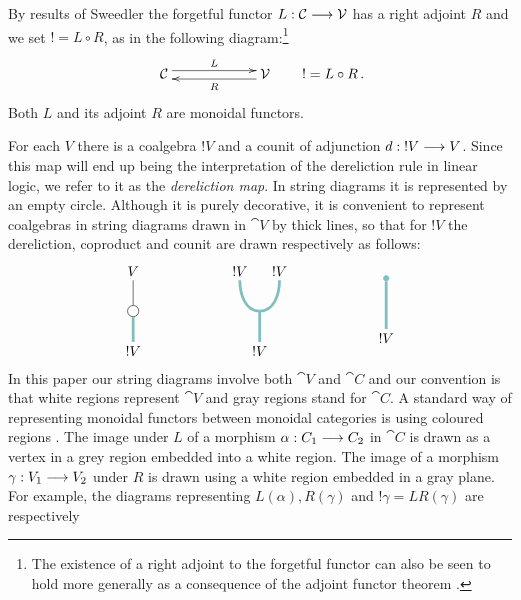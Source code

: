 \documentclass[english,letter paper,12pt,reqno]{article}
\def\drawbang{\draw[color=teal!50, line width=2pt]}
\def\dernode{\node[circle,draw=black,fill=white]}
\theoremstyle{example}
\begin{document}
By results of Sweedler \cite[Chapter 6]{sweedler} the forgetful functor $L: \mathcal{C} \longrightarrow \mathcal{V}$ has a right adjoint $R$ and we set ${!} = L \circ R$, as in the following diagram:\footnote{The existence of a right adjoint to the forgetful functor can also be seen to hold more generally as a consequence of the adjoint functor theorem \cite{barr}.}
\[
\xymatrix@C+3pc{
\cat{C}\ar@<0.7ex>[r]^-{L} & \cat{V} \ar@<0.7ex>[l]^-{R}
}
\qquad
! = L \circ R\,.
\]
Both $L$ and its adjoint $R$ are monoidal functors.

For each $V$ there is a coalgebra $! V$ and a counit of adjunction $d: {!} V \longrightarrow V$. Since this map will end up being the interpretation of the dereliction rule in linear logic, we refer to it as the \emph{dereliction map}. In string diagrams it is represented by an empty circle. Although it is purely decorative, it is convenient to represent coalgebras in string diagrams drawn in $\cat{V}$ by thick lines, so that for ${!} V$ the dereliction, coproduct and counit are drawn respectively as follows:
\begin{equation}\label{eq:coalgebra_maps}
\begin{tikzpicture}[scale=0.5,auto,inner sep=1mm,baseline=(current  bounding  box.center)]
\node (top) at (0,2) {$V$};
\dernode (d) at (0,0) {};
\node (banga) at (0,-2) {$!V$};
\drawbang (banga) -- (d);
\draw (d) -- (top);
\end{tikzpicture}
\qquad\qquad\qquad
\begin{tikzpicture}[scale=0.5,auto,inner sep=1mm,baseline=(current  bounding  box.center)]
\node (topl) at (-1,2) {${!} V$};
\node (topr) at (1,2) {${!} V$};
\coordinate (d) at (0,0);
\node (banga) at (0,-2) {$!V$};
\drawbang (banga) -- (d);
\drawbang[out=0,in=270] (d) to (topr);
\drawbang[out=180,in=270] (d) to (topl);
\end{tikzpicture}
\qquad\qquad\qquad
\begin{tikzpicture}[scale=0.5,auto,inner sep=1mm,baseline=(current  bounding  box.center)]
\node (banga) at (0,-2) {$!V$};
\node[circle,draw=teal!50,fill=teal!50,inner sep=0.5mm] (blah) at (0,1) {};
\drawbang (banga) -- (blah);
\end{tikzpicture}
\end{equation}
In this paper our string diagrams involve both $\cat{V}$ and $\cat{C}$ and our convention is that white regions represent $\cat{V}$ and gray regions stand for $\cat{C}$. A standard way of representing monoidal functors between monoidal categories is using coloured regions \cite[\S 5.7]{mellies}. The image under $L$ of a morphism $\alpha: C_1 \longrightarrow C_2$ in $\cat{C}$ is drawn as a vertex in a grey region embedded into a white region. The image of a morphism $\gamma: V_1 \longrightarrow V_2$ under $R$ is drawn using a white region embedded in a gray plane. For example, the diagrams representing $L(\alpha), R(\gamma)$ and ${!} \gamma = LR(\gamma)$ are respectively
\end{document}
